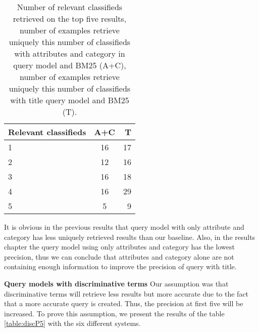 \begin{table}[H]
\begin{center}
\caption{Number of relevant classifieds retrieved on the top five results, number of examples retrieve uniquely this number of classifieds with attributes and category in query model and BM25 (A+C), number of examples retrieve uniquely this number of classifieds with title query model and BM25 (T).}
\label{table:AcVsT}
\begin{tabular}{lcr}
\midrule
Relevant classifieds &  A+C & T \\
\midrule
	1 & 16 & 17 \\
	2 & 12  & 16 \\
	3 & 16 & 18 \\
	4 & 16 & 29 \\
	5 & 5 & 9 \\
\bottomrule
\end{tabular}
\end{center}
\end{table}



It is obvious in the previous results that query model with only attribute and category has less uniquely retrieved results than our baseline. Also, in the results chapter the query model using only attributes and category has the lowest precision, thus we can conclude that attributes and category alone are not containing enough information to improve the precision of query with title.


 \textbf{Query models with discriminative terms}
Our assumption was that discriminative terms will retrieve less results but more accurate due to the fact that a more accurate query is created. Thus, the precision at first five will be increased. To prove this assumption, we present the results of the table \ref{table:discP5} with the six different systems.


